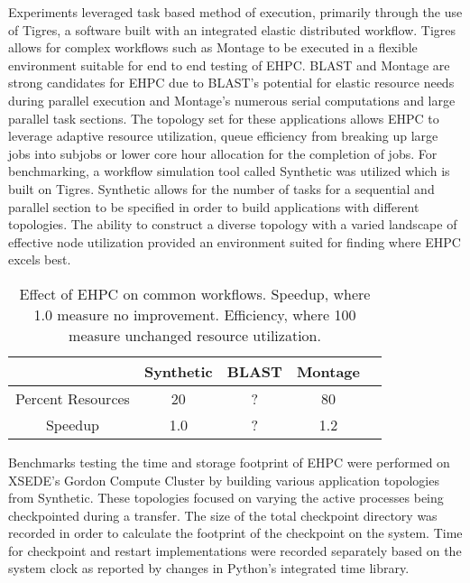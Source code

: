 Experiments leveraged task based method of execution, primarily through the use of Tigres, a software built with an integrated elastic distributed workflow\cite{hendrix2016tigres}.  Tigres allows for complex workflows such as Montage to be executed in a flexible environment suitable for end to end testing of EHPC. BLAST and Montage are strong candidates for EHPC due to BLAST's potential for elastic resource needs during parallel execution and Montage's numerous serial computations and large parallel task sections\cite{camp}\cite{montage}. The topology set for these applications allows EHPC to leverage adaptive resource utilization, queue efficiency from breaking up large jobs into subjobs or lower core hour allocation for the completion of jobs.  For benchmarking, a workflow simulation tool called Synthetic was utilized which is built on Tigres. Synthetic allows for the number of tasks for a sequential and parallel section to be specified in order to build applications with different topologies. The ability to construct a diverse topology with a varied landscape of effective node utilization provided an environment suited for finding where EHPC excels best.



\begin{table}
\begin{center}
 \begin{tabular}{||c c c c c||} 
 \hline
  & Synthetic & BLAST & Montage \\ [0.5ex] 
 \hline\hline
 Percent Resources & 20 & ? & 80 \\ 
 \hline
 Speedup & 1.0 & ? & 1.2 \\
 \hline
\end{tabular}
\end{center}
\caption{Effect of EHPC on common workflows. Speedup, where 1.0 measure no improvement. Efficiency, where 100 measure unchanged resource utilization.}
\label{tab:speedup_efficiency}
\end{table}


Benchmarks testing the time and storage footprint of EHPC were performed on XSEDE's Gordon Compute Cluster by building various application topologies from Synthetic.  These topologies focused on varying the active processes being checkpointed during a transfer. The size of the total checkpoint directory was recorded in order to calculate the footprint of the checkpoint on the system. Time for checkpoint and restart implementations were recorded separately based on the system clock as reported by changes in Python's integrated time library. 

